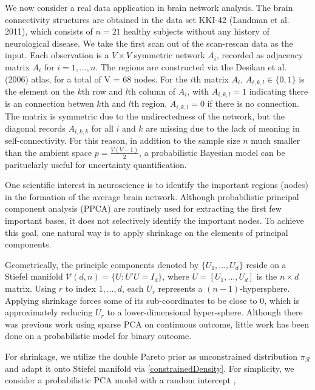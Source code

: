 \documentclass[10pt,fleqn]{article}
\newcommand{\mc}[1]{\mathcal{#1}}
\DeclareMathOperator{\1}{\mathbbm{1}}
\begin{document}
 We now consider a real data application in brain network analysis. 
 The brain connectivity structures are obtained in the data set KKI-42 (Landman et al. 2011), which consists of $n=21$ healthy subjects without any history of neurological disease. We take the first scan out of the scan-rescan data
as the input. Each observation is a $V\times V$ symmetric network $A_i$, recorded as adjacency matrix $A_i$ for $i=1,\ldots,n$. The regions are constructed via the Desikan et al. (2006) atlas, for a total of V = 68 nodes.
For the $i$th matrix $A_i$, $A_{i,k,l} \in \{0,1\}$ is the element on the $k$th row and $l$th column of $A_i$, with $A_{i,k,l}=1$ indicating there is an connection betwen $k$th and $l$th region, $A_{i,k,l}=0$ if there is no connection. The matrix is symmetric due to the undirectedness of the network,
but the diagonal records $A_{i,k,k}$ for all $i$ and $k$ are missing due
to the lack of meaning in self-connectivity. For this reason, in addition
to the sample size $n$ much smaller
than the ambient space $p=\frac{V(V-1)}{2}$, a probabilistic Bayesian model can be parituclarly
useful for uncertainty quantification.

One scientific interest in neuroscience is to identify the important regions
(nodes) in the formation of the average brain network. Although probabilistic
principal component analysis (PPCA) are routinely used for  extracting the first few important bases, it does not selectively identify the important nodes. To
achieve this goal, one natural way is to apply shrinkage on the elements
of principal components.


Geometrically, the principle components denoted by $\{U_1,\ldots,U_d\}$ reside on a Stiefel manifold $\mc V(d,n)=\{U: U'U=I_d\}$, where $U=[U_1,\ldots,U_d]$ is the $n\times d$ matrix. Using $r$ to index $1,\ldots,d$, each $U_r$ represents a $(n-1)$-hypersphere. Applying shrinkage forces some of its sub-coordinates to be close to $0$, which
is approximately reducing $U_r$ to a lower-dimensional hyper-sphere.
Although there was previous work using sparse PCA \citep{zou2006sparse} on
continuous outcome, little work has been done on a probabilistic model for
binary outcome.



For shrinkage, we utilize the double Pareto prior \citep{armagan2013generalized} as unconstrained distribution
$\pi_{\mc R}$ and adapt it onto Stiefel manifold via \eqref{constrainedDensity}. For simplicity, we consider a probabilistic PCA model with a random intercept ,
\end{document}
